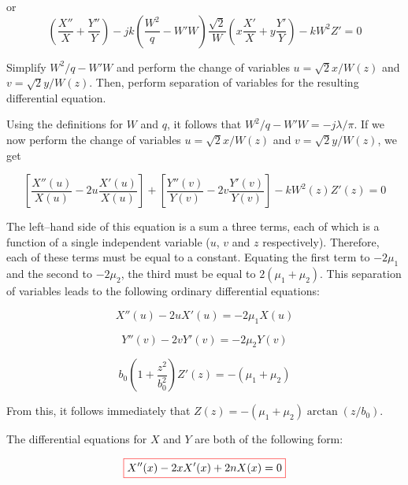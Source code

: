 or
\begin{equation}
\left(\frac{X''}{X}+\frac{Y''}{Y}\right)  
- j k  \left(\frac{W^2}{q} - W'W\right)\frac{\sqrt{2}}{W}\left(x\frac{X'}{X}+y\frac{Y'}{Y}\right)
-kW^2Z' = 0
\end{equation} 

\begin{cue}
Simplify $W^2/q - W'W$ and perform the change of variables $u = \sqrt{2} x / W(z)$ and  $v = \sqrt{2} y / W(z)$. Then, perform separation of variables for the resulting differential equation. 
\end{cue}

Using the definitions for $W$ and $q$, it follows that $W^2/q - W'W = -j \lambda / \pi$. If we now perform the change of variables $u = \sqrt{2} x / W(z)$ and  $v = \sqrt{2} y / W(z)$, we get

\begin{equation}
\left[{\frac{X''(u)}{X(u)} - 2 u\frac{X'(u)}{X(u)}}\right] + 
\left[{\frac{Y''(v)}{Y(v)} - 2 v\frac{Y'(v)}{Y(v)}}\right] -kW^2(z)Z'(z) = 0
\end{equation} 

The left--hand side of this equation is a sum a three terms, each of which is a function of a single independent variable ($u$, $v$ and $z$ respectively). Therefore, each of these terms must be equal to a constant. Equating the first term to $-2\mu_1$ and the second to $-2\mu_2$, the third must be equal to $2(\mu_1+\mu_2)$. This separation of variables leads to the following ordinary differential equations:

\begin{equation}
X''(u) - 2 u X'(u) = - 2 \mu_1 X(u) 
\end{equation} 

\begin{equation}
Y''(v) - 2 v Y'(v) = - 2 \mu_2 Y(v)
\end{equation} 

\begin{equation}
b_0\left(1 + \frac{z^2}{b_0^2}\right)Z'(z) = -(\mu_1+\mu_2)
\end{equation} 

From this, it follows immediately that $Z(z) = -(\mu_1+\mu_2) \arctan(z/b_0)$.

The differential equations for $X$ and $Y$ are both of the following form:

\begin{equation}
\fbox{$\displaystyle
X''(x) - 2 x X'(x) + 2 n X(x) = 0 \label{eq-diff-hermite-0}
$}
\end{equation} 

